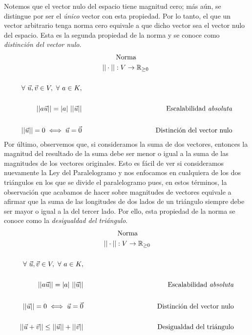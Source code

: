 \documentclass[12pt,dvipsnames]{article}
\numberwithin{equation}{section}
\begin{document}
Notemos que el vector nulo del espacio tiene magnitud cero; más aún, se distingue por ser el \emph{único} vector con esta propiedad. Por lo tanto, el que un vector arbitrario tenga norma cero equivale a que dicho vector sea el vector nulo del espacio. Esta es la segunda propiedad de la norma y se conoce como \emph{distinción del vector nulo}. %
\begin{align*}
     &\quad \quad \quad \quad \quad \text{Norma}& \\
     &\quad \quad \quad ||\cdot||:V\to \mathbb{R}_{\ge0}& \\
     \\
     \forall \ \vec{u},\vec{v}\in V, \ \forall \ a\in K, \\
    \\
    ||a\vec{u}|| = |a| \ ||\vec{u}|| &&\text{Escalabilidad \emph{absoluta}} \\
     \\
    ||\vec{u}|| = 0 \iff \vec{u} = \vec{0} &&\text{Distinción del vector nulo}
\end{align*}
Por último, observemos que, si consideramos la suma de dos vectores, entonces la magnitud del resultado de la suma debe ser menor o igual a la suma de las magnitudes de los vectores originales. Esto es fácil de ver si consideramos nuevamente la Ley del Paralelogramo y nos enfocamos en cualquiera de los dos triángulos en los que se divide el paralelogramo pues, en estos términos, la observación que acabamos de hacer sobre magnitudes de vectores equivale a afirmar que la suma de las longitudes de dos lados de un triángulo siempre debe ser mayor o igual a la del tercer lado. Por ello, esta propiedad de la norma se conoce como la \emph{desigualdad del triángulo}.
\begin{align*}
     &\quad \quad \quad \quad \quad \text{Norma}& \\
     &\quad \quad \quad ||\cdot||:V\to \mathbb{R}_{\ge0}& \\
     \\
     \forall \ \vec{u}, \vec{v}\in V, \ \forall \ a\in K, \\
    \\
    ||a\vec{u}|| = |a| \ ||\vec{u}|| &&\text{Escalabilidad \emph{absoluta}} \\
     \\
    ||\vec{u}|| = 0 \iff \vec{u} = \vec{0} &&\text{Distinción del vector nulo} \\
    \\
    ||\vec{u}+\vec{v}|| \le ||\vec{u}|| + ||\vec{v}|| &&\text{Desigualdad del triángulo}
\end{align*}
\end{document}
